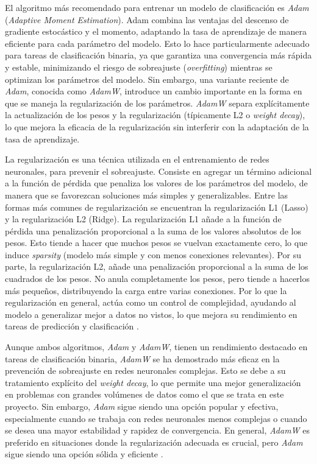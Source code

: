 El algoritmo más recomendado para entrenar un modelo de clasificación es \textit{Adam} (\textit{Adaptive Moment Estimation}). Adam combina las ventajas del descenso de gradiente estocástico y el momento, adaptando la tasa de aprendizaje de manera eficiente para cada parámetro del modelo. Esto lo hace particularmente adecuado para tareas de clasificación binaria, ya que garantiza una convergencia más rápida y estable, minimizando el riesgo de sobreajuste (\textit{overfitting}) mientras se optimizan los parámetros del modelo. Sin embargo, una variante reciente de \textit{Adam}, conocida como \textit{AdamW}, introduce un cambio importante en la forma en que se maneja la regularización de los parámetros. \textit{AdamW} separa explícitamente la actualización de los pesos y la regularización (típicamente L2 o \textit{weight decay}), lo que mejora la eficacia de la regularización sin interferir con la adaptación de la tasa de aprendizaje.

La regularización es una técnica utilizada en el entrenamiento de redes neuronales, para prevenir el sobreajuste. Consiste en agregar un término adicional a la función de pérdida que penaliza los valores de los parámetros del modelo, de manera que se favorezcan soluciones más simples y generalizables. Entre las formas más comunes de regularización se encuentran la regularización L1 (Lasso) y la regularización L2 (Ridge). La regularización L1 añade a la función de pérdida una penalización proporcional a la suma de los valores absolutos de los pesos. Esto tiende a hacer que muchos pesos se vuelvan exactamente cero, lo que induce \textit{sparsity} (modelo más simple y con menos conexiones relevantes). Por su parte, la regularización L2, añade una penalización proporcional a la suma de los cuadrados de los pesos. No anula completamente los pesos, pero tiende a hacerlos más pequeños, distribuyendo la carga entre varias conexiones. Por lo que la regularización en general, actúa como un control de complejidad, ayudando al modelo a generalizar mejor a datos no vistos, lo que mejora su rendimiento en tareas de predicción y clasificación \cite{bishop2006pattern}.

Aunque ambos algoritmos, \textit{Adam} y \textit{AdamW}, tienen un rendimiento destacado en tareas de clasificación binaria, \textit{AdamW} se ha demostrado más eficaz en la prevención de sobreajuste en redes neuronales complejas. Esto se debe a su tratamiento explícito del \textit{weight decay}, lo que permite una mejor generalización en problemas con grandes volúmenes de datos como el que se trata en este proyecto. Sin embargo, \textit{Adam} sigue siendo una opción popular y efectiva, especialmente cuando se trabaja con redes neuronales menos complejas o cuando se desea una mayor estabilidad y rapidez de convergencia. En general, \textit{AdamW} es preferido en situaciones donde la regularización adecuada es crucial, pero \textit{Adam} sigue siendo una opción sólida y eficiente \cite{kingma2014adam}.


